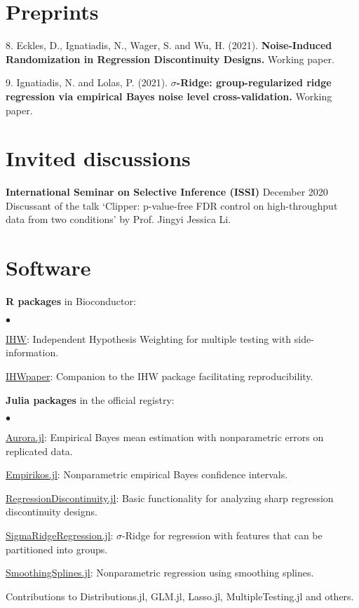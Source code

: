 \documentclass[margin,line]{res}
\newenvironment{list1}{
  \begin{list}{\ding{113}}{%
      \setlength{\itemsep}{0in}
      \setlength{\parsep}{0in} \setlength{\parskip}{0in}
      \setlength{\topsep}{0in} \setlength{\partopsep}{0in}
      \setlength{\leftmargin}{0.17in}}}{\end{list}}
\newenvironment{list2}{
  \begin{list}{$\bullet$}{%
      \setlength{\itemsep}{0in}
      \setlength{\parsep}{0in} \setlength{\parskip}{0in}
      \setlength{\topsep}{0in} \setlength{\partopsep}{0in}
      \setlength{\leftmargin}{0.2in}}}{\end{list}}
\begin{document}
\begin{resume}
\section{\sc Preprints}
\begin{list1}
\item[8.] Eckles, D., Ignatiadis, N., Wager, S. and Wu, H. (2021). \textbf{Noise-Induced Randomization in Regression Discontinuity Designs.} Working paper.
\item[9.] Ignatiadis, N. and Lolas, P.  (2021). \textbf{$\sigma$-Ridge: group-regularized ridge regression via empirical Bayes noise level cross-validation.} Working paper.
\end{list1}


\section{\sc Invited discussions}
\textbf{International Seminar on Selective Inference (ISSI)} \hfill December 2020\\
Discussant of the talk `Clipper: p-value-free FDR control on high-throughput data from two conditions' 
by Prof. Jingyi Jessica Li.

\section{\sc Software}
{\bf R packages} in Bioconductor:
\begin{list2}
\item \href{https://bioconductor.org/packages/IHW}{{\color{urlblue} IHW}}:  Independent Hypothesis Weighting for multiple testing with side-information.
\item \href{https://bioconductor.org/packages/IHWpaper}{{\color{urlblue} IHWpaper}}: Companion to the IHW package facilitating reproducibility.
\end{list2}
{\bf Julia packages} in the official registry:
\begin{list2}
\item \href{https://github.com/nignatiadis/Aurora.jl}{{\color{urlblue} Aurora.jl}}: Empirical Bayes mean estimation with nonparametric errors on replicated data.
\item \href{https://github.com/nignatiadis/Empirikos.jl}{{\color{urlblue} Empirikos.jl}}: Nonparametric empirical Bayes confidence intervals.
\item \href{https://github.com/nignatiadis/RegressionDiscontinuity.jl}{{\color{urlblue}  RegressionDiscontinuity.jl}}: Basic functionality for analyzing sharp regression discontinuity designs. 
\item \href{https://github.com/nignatiadis/SigmaRidgeRegression.jl}{{\color{urlblue} SigmaRidgeRegression.jl}}: $\sigma$-Ridge for regression with features that can be partitioned into groups.
\item \href{https://github.com/nignatiadis/SmoothingSplines.jl}{{\color{urlblue} SmoothingSplines.jl}}: Nonparametric regression using smoothing splines.
\item Contributions to Distributions.jl, GLM.jl, Lasso.jl, MultipleTesting.jl and others.
\end{list2}



\end{resume}
\end{document}
